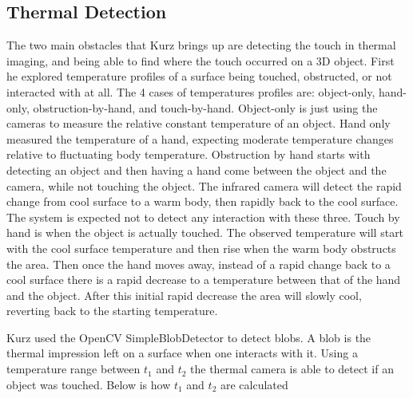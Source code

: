 \documentclass{sig-alternate}
\begin{document}


\subsection{Thermal Detection}
\label{Thermal Detection}
The two main obstacles that Kurz brings up are detecting the touch in thermal imaging, and being able to find where the touch occurred on a 3D object. First he explored temperature profiles of a surface being touched, obstructed, or not interacted with at all. The 4 cases of temperatures profiles are: object-only, hand-only, obstruction-by-hand, and touch-by-hand. Object-only is just using the cameras to measure the relative constant temperature of an object. Hand only measured the temperature of a hand, expecting moderate temperature changes relative to fluctuating body temperature. Obstruction by hand starts with detecting an object and then having a hand come between the object and the camera, while not touching the object. The infrared camera will detect the rapid change from cool surface to a warm body, then rapidly back to the cool surface. The system is expected not to detect any interaction with these three. Touch by hand is when the object is actually touched. The observed temperature  will start with the cool surface temperature and then rise when the warm body obstructs the area. Then once the hand moves away, instead of a rapid change back to a cool surface there is a rapid decrease to a temperature between that of the hand and the object. After this initial rapid decrease the area will slowly cool, reverting back to the starting temperature. 

Kurz used the OpenCV SimpleBlobDetector to detect blobs. A blob is the thermal impression left on a surface when one interacts with it. Using a temperature range between \(t_1\) and \(t_2\) the thermal camera is able to detect if an object was touched. Below is how \(t_1\) and \(t_2\) are calculated
\end{document}
